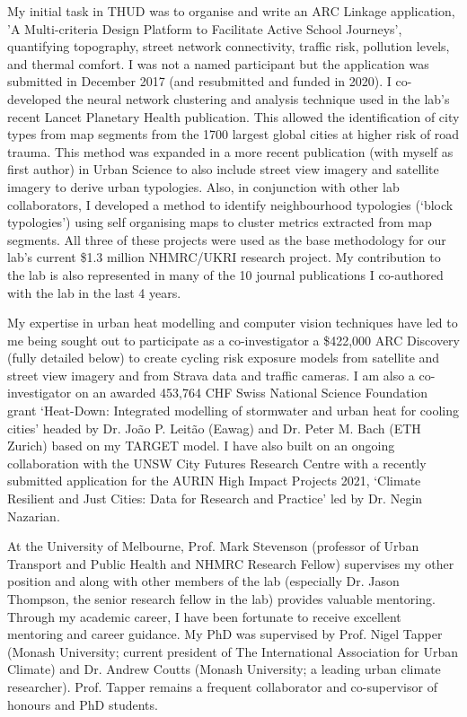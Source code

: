 My initial task in THUD was to organise and write an ARC Linkage application, 'A Multi-criteria Design Platform to Facilitate Active School Journeys', quantifying topography, street network connectivity, traffic risk, pollution levels, and thermal comfort. I was not a named participant but the application was submitted in December 2017 (and resubmitted and funded in 2020). I co-developed the neural network clustering and analysis technique used in the lab's recent Lancet Planetary Health publication. This allowed the identification of city types from map segments from the 1700 largest global cities at higher risk of road trauma. This method was expanded in a more recent publication (with myself as first author) in Urban Science to also include street view imagery and satellite imagery to derive urban typologies. Also, in conjunction with other lab collaborators, I developed a method to identify neighbourhood typologies (`block typologies') using self organising maps to cluster metrics extracted from map segments. All three of these projects were used as the base methodology for our lab's current \$1.3 million NHMRC/UKRI research project. My contribution to the lab is also represented in many of the 10 journal publications I co-authored with the lab in the last 4 years.

My expertise in urban heat modelling and computer vision techniques have led to me being sought out to participate as a co-investigator a \$422,000 ARC Discovery (fully detailed below) to create cycling risk exposure models from satellite and street view imagery and from Strava data and traffic cameras. I am also a co-investigator on an awarded 453,764 CHF Swiss National Science Foundation grant `Heat-Down: Integrated modelling of stormwater and urban heat for cooling cities' headed by Dr. Jo\~{a}o P. Leit\~{a}o (Eawag) and Dr. Peter M. Bach (ETH Zurich) based on my TARGET model. I have also built on an ongoing collaboration with the UNSW City Futures Research Centre with a recently submitted application for the AURIN High Impact Projects 2021, `Climate Resilient and Just Cities: Data for Research and Practice' led by Dr. Negin Nazarian.

At the University of Melbourne, Prof. Mark Stevenson (professor of Urban Transport and Public Health and NHMRC Research Fellow) supervises my other position and along with other members of the lab (especially Dr. Jason Thompson, the senior research fellow in the lab) provides valuable mentoring. Through my academic career, I have been fortunate to receive excellent mentoring and career guidance. My PhD was supervised by Prof. Nigel Tapper (Monash University; current president of The International Association for Urban Climate) and Dr. Andrew Coutts (Monash University; a leading urban climate researcher). Prof. Tapper remains a frequent collaborator and co-supervisor of honours and PhD students. 




